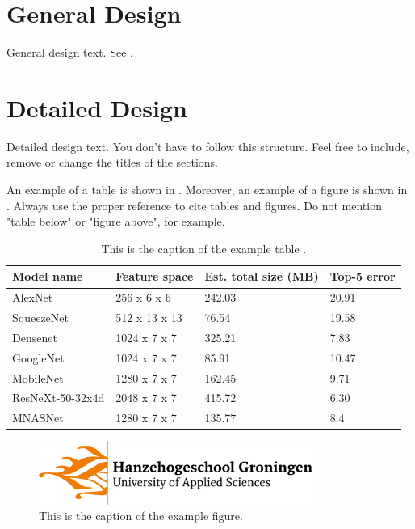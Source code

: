 \section{General Design}

General design text. See .  %

\section{Detailed Design}

Detailed design text. You don't have to follow this structure. Feel free to include, remove or change the titles of the sections.

An example of a table is shown in . Moreover, an example of a figure is shown in . Always use the proper reference to cite tables and figures. Do not mention "table below" or "figure above", for example.

\begin{table}
    \centering
        \begin{tabular}{ p{35mm}  P{3cm}   P{40mm}  P{3cm}}
            \hline
            Model name & Feature space & Est. total size (MB) & Top-5 error \\
            \hline
            AlexNet          &   256  x 6 x  6     &  242.03  &    20.91 \\
            SqueezeNet       &   512  x 13 x 13   &   76.54   &    19.58 \\
            Densenet         &   1024 x 7 x  7    &   325.21  &    7.83  \\
            GoogleNet        &   1024 x 7 x  7    &   85.91   &    10.47 \\
            MobileNet        &   1280 x 7 x  7    &   162.45  &    9.71  \\
            ResNeXt-50-32x4d &   2048 x 7 x  7    &   415.72  &    6.30  \\
            MNASNet          &   1280 x 7 x  7    &   135.77  &    8.4  \\
            \hline
        \end{tabular}
    \caption{This is the caption of the example table \cite{torchvisionmodels}.}
    \label{tab:models}
\end{table}


\begin{figure}[b]  %
    \centering
    \includegraphics[width=0.8\textwidth]{images/hanzelogo_nl.png}
    \caption{This is the caption of the example figure.}
    \label{fig:example_figure}
\end{figure}


